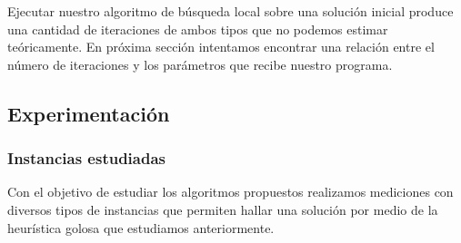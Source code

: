 Ejecutar nuestro algoritmo de b\'usqueda local sobre una soluci\'on inicial produce una cantidad de iteraciones de ambos tipos que no podemos estimar te\'oricamente. En pr\'oxima secci\'on intentamos encontrar una relaci\'on entre el n\'umero de iteraciones y los par\'ametros que recibe nuestro programa.

\subsection{Experimentación}



\subsubsection{Instancias estudiadas}

Con el objetivo de estudiar los algoritmos propuestos realizamos mediciones con diversos tipos de instancias que permiten hallar una soluci\'on por medio de la heur\'istica golosa que estudiamos anteriormente.

